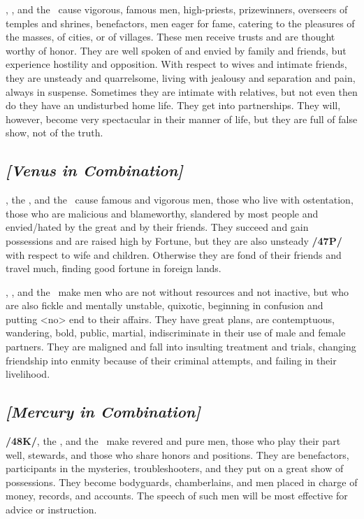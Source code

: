 \Jupiter, \Venus, and the \Moon\, cause vigorous, famous men, high-priests, prizewinners, overseers of temples and shrines, benefactors, men eager for fame, catering to the pleasures of the masses, of cities, or of villages. These men receive trusts and are thought worthy of honor. They are well spoken of and envied by family and friends, but experience hostility and opposition. With respect to wives and intimate friends, they are unsteady and quarrelsome, living with jealousy and separation and pain, always in suspense. Sometimes they are intimate with relatives, but not even then do they have an undisturbed home life. They get into partnerships. They will, however, become very spectacular in their manner of life, but they are full of false show, not of the truth.

\secbr
{}
\subsection{\textit{[Venus in Combination]}}
\Venus, the \Sun, and the \Moon\, cause famous and vigorous men, those who live with ostentation, those who are malicious and blameworthy, slandered by most people and envied/hated by the great and by their friends. They succeed and gain possessions and are raised high by Fortune, but they are also unsteady
\textbf{/47P/} with respect to wife and children. Otherwise they are fond of their friends and travel much, finding
good fortune in foreign lands.

\Venus, \Mars, and the \Moon\, make men who are not without resources and not inactive, but who are also fickle and mentally unstable, quixotic, beginning in confusion and putting <no> end to their affairs. They have great plans, are contemptuous, wandering, bold, public, martial, indiscriminate in their use of male and female partners. They are maligned and fall into insulting treatment and trials, changing friendship into enmity because of their criminal attempts, and failing in their livelihood.

\secbr
{}
\subsection{\textit{[Mercury in Combination]}}
\textbf{/48K/}\Mercury, the \Sun, and the \Moon\, make revered and pure men, those who play their part well, stewards, and those who share honors and positions. They are benefactors, participants in the mysteries, troubleshooters, and they put on a great show of possessions. They become bodyguards, chamberlains, and men placed in charge of money, records, and accounts. The speech of such men will be most effective for advice or instruction.

